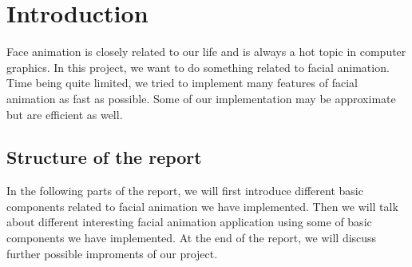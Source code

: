
\section{Introduction}
Face animation is closely related to our life and is always a hot topic in computer graphics. In this project, we want to do something related to facial animation. Time being quite limited, we tried to implement many features of facial animation as fast as possible. Some of our implementation may be approximate but are efficient as well. 
\subsection{Structure of the report}
In the following parts of the report, we will first introduce different basic components related to facial animation we have implemented. Then we will talk about different interesting facial animation application using some of basic components we have implemented. At the end of the report, we will discuss further possible improments of our project.
